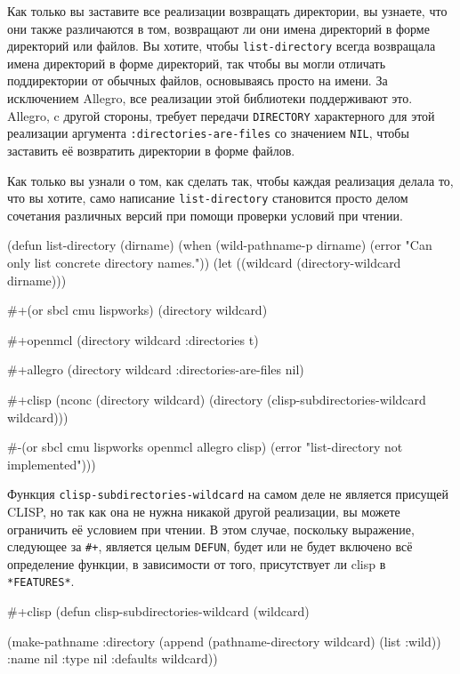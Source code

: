 Как только вы заставите все реализации возвращать директории, вы узнаете, что они также
различаются в том, возвращают ли они имена директорий в форме директорий или файлов. Вы
хотите, чтобы \lstinline{list-directory} всегда возвращала имена директорий в форме директорий,
так чтобы вы могли отличать поддиректории от обычных файлов, основываясь просто на
имени. За исключением Allegro, все реализации этой библиотеки поддерживают это.  Allegro,
c другой стороны, требует передачи \lstinline{DIRECTORY} характерного для этой реализации
аргумента \lstinline{:directories-are-files} со значением \lstinline{NIL}, чтобы заставить её
возвратить директории в форме файлов.

Как только вы узнали о том, как сделать так, чтобы каждая реализация делала то, что вы
хотите, само написание \lstinline{list-directory} становится просто делом сочетания различных
версий при помощи проверки условий при чтении.

\begin{myverb}
(defun list-directory (dirname)
  (when (wild-pathname-p dirname)
    (error "Can only list concrete directory names."))
  (let ((wildcard (directory-wildcard dirname)))

    #+(or sbcl cmu lispworks)
    (directory wildcard)

    #+openmcl
    (directory wildcard :directories t)

    #+allegro
    (directory wildcard :directories-are-files nil)

    #+clisp
    (nconc
     (directory wildcard)
     (directory (clisp-subdirectories-wildcard wildcard)))

    #-(or sbcl cmu lispworks openmcl allegro clisp)
    (error "list-directory not implemented")))
\end{myverb}

Функция \lstinline{clisp-subdirectories-wildcard} на самом деле не является присущей CLISP, но
так как она не нужна никакой другой реализации, вы можете ограничить её условием при
чтении. В этом случае, поскольку выражение, следующее за \lstinline!#+!, является целым
\lstinline{DEFUN}, будет или не будет включено всё определение функции, в зависимости от того,
присутствует ли clisp в \lstinline{*FEATURES*}.

\begin{myverb}
#+clisp
(defun clisp-subdirectories-wildcard (wildcard)

  (make-pathname
   :directory (append (pathname-directory wildcard) (list :wild))
   :name nil
   :type nil
   :defaults wildcard))
\end{myverb}

